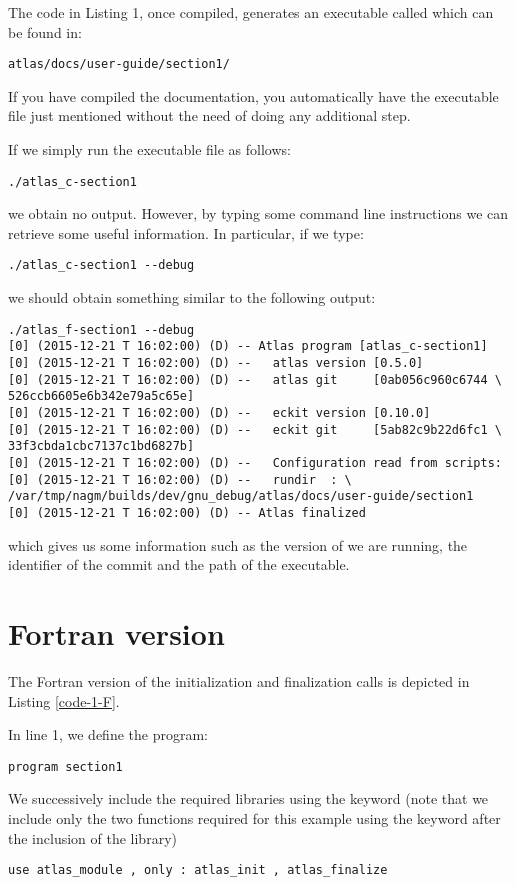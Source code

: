 The code in Listing 1, once compiled, generates an executable 
called  which can be found in:
%
\begin{lstlisting}[style=BashStyle]
atlas/docs/user-guide/section1/
\end{lstlisting}
% 
\begin{notebox}
If you have compiled the documentation, you automatically have 
the executable file just mentioned without the need of doing 
any additional step.
\end{notebox}
%
If we simply run the executable file as follows:
%
\begin{lstlisting}[style=BashStyle]
./atlas_c-section1
\end{lstlisting}
% 
we obtain no output. 
However, by typing some command line instructions we can retrieve 
some useful information. In particular, if we type:
%
\begin{lstlisting}[style=BashStyle]
./atlas_c-section1 --debug
\end{lstlisting}
%
we should obtain something similar to the following output:
%
\begin{lstlisting}[style=BashStyle]
./atlas_f-section1 --debug
[0] (2015-12-21 T 16:02:00) (D) -- Atlas program [atlas_c-section1]
[0] (2015-12-21 T 16:02:00) (D) --   atlas version [0.5.0]
[0] (2015-12-21 T 16:02:00) (D) --   atlas git     [0ab056c960c6744 \
526ccb6605e6b342e79a5c65e]
[0] (2015-12-21 T 16:02:00) (D) --   eckit version [0.10.0]
[0] (2015-12-21 T 16:02:00) (D) --   eckit git     [5ab82c9b22d6fc1 \
33f3cbda1cbc7137c1bd6827b]
[0] (2015-12-21 T 16:02:00) (D) --   Configuration read from scripts:
[0] (2015-12-21 T 16:02:00) (D) --   rundir  : \ 
/var/tmp/nagm/builds/dev/gnu_debug/atlas/docs/user-guide/section1
[0] (2015-12-21 T 16:02:00) (D) -- Atlas finalized
\end{lstlisting}
%
which gives us some information such as the version of \Atlas we are 
running, the identifier of the commit and the path of the executable. 



\section{Fortran version}
\label{s:atlas-section1-F}
The Fortran version of the \Atlas initialization and finalization 
calls is depicted in Listing \ref{code-1-F}.
%

%
In line 1, we define the program:
%
\begin{lstlisting}[style=FStyleNoLine]
program section1
\end{lstlisting}
%
We successively include the required \Atlas libraries using the 
keyword  (note that we include only the two functions 
required for this example using the keyword  after 
the inclusion of the library)
%
\begin{lstlisting}[style=FStyleNoLine]
use atlas_module , only : atlas_init , atlas_finalize
\end{lstlisting}
%
 
